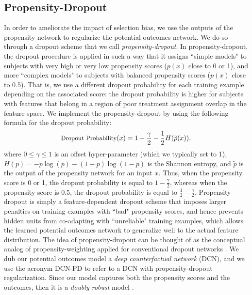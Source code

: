 \documentclass{article}
\begin{document}
\subsection{Propensity-Dropout}
In order to ameliorate the impact of selection bias, we use the outputs of the propensity network to regularize the potential outcomes network. We do so through a dropout scheme that we call {\it propensity-dropout}. In propensity-dropout, the dropout procedure is applied in such a way that it assigns ``simple models" to subjects with very high or very low propensity scores ($p(x)$ close to 0 or 1), and more ``complex models" to subjects with balanced propensity scores ($p(x)$ close to 0.5). That is, we use a different dropout probability for each training example depending on the associated score: the dropout probability is higher for subjects with features that belong in a region of poor treatment assignment overlap in the feature space. We implement the propensity-dropout by using the following formula for the dropout probability:
\begin{equation}
\mbox{\small Dropout Probability}(x) = 1-\frac{\gamma}{2}-\frac{1}{2}H(\tilde{p}(x)), 
\label{eqqqq2}
\end{equation}
where $0\leq \gamma \leq 1$ is an offset hyper-parameter (which we typically set to 1), $H(p) = -p\log(p)-(1-p)\log(1-p)$ is the Shannon entropy, and $\tilde{p}$ is the output of the propensity network for an input $x$. Thus, when the propensity score is 0 or 1, the dropout probability is equal to $1-\frac{\gamma}{2}$, whereas when the propensity score is 0.5, the dropout probability is equal to $\frac{1}{2}-\frac{\gamma}{2}$. Propensity-dropout is simply a feature-dependent dropout scheme that imposes larger penalties on training examples with ``bad" propensity scores, and hence prevents hidden units from co-adapting with ``unreliable" training examples, which allows the learned potential outcomes network to generalize well to the actual feature distribution. The idea of propensity-dropout can be thought of as the conceptual analog of propensity-weighting \cite{abadie2016matching} applied for conventional dropout networks \cite{srivastava2014dropout}. We dub our potential outcomes model a {\it deep counterfactual network} (DCN), and we use the acronym DCN-PD to refer to a DCN with propensity-dropout regularization. Since our model captures both the propensity scores and the outcomes, then it is a {\it doubly-robust} model \cite{dudik2014doubly,dudik2011doubly}.
\end{document}

